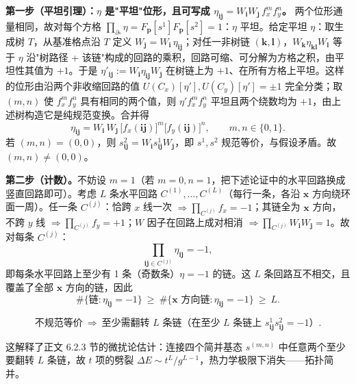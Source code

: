\textbf{第一步（平坦引理）：$\eta$ 是"平坦"位形，且可写成 $\eta_{\pmb{ij}}=W_{\pmb i}W_{\pmb j}\,f_x^{m}f_y^{n}$。}
两个位形通量相同，故对每个方格 $\prod_{\partial\square}\eta=F_{\pmb p}[s^1]F_{\pmb p}[s^2]=1$：$\eta$ 平坦。给定平坦 $\eta$：取生成树 $T$，从基准格点沿 $T$ 定义 $W_{\pmb j}=W_{\pmb i}\,\eta_{\pmb{ij}}$；对任一非树链 $(\pmb k,\pmb l)$，$W_{\pmb k}\eta_{\pmb{kl}}W_{\pmb l}$ 等于 $\eta$ 沿"树路径 + 该链"构成的回路的乘积，回路可缩、可分解为方格之积，由平坦性其值为 $+1$。于是 $\eta'_{\pmb{ij}}:=W_{\pmb i}\eta_{\pmb{ij}}W_{\pmb j}$ 在树链上为 $+1$、在所有方格上平坦。这样的位形由沿两个非收缩回路的值 $U(C_x)[\eta'],U(C_y)[\eta']=\pm1$ 完全分类；取 $(m,n)$ 使 $f_x^{m}f_y^{n}$ 具有相同的两个值，则 $\eta'f_x^{m}f_y^{n}$ 平坦且两个绕数均为 $+1$，由上述树构造它是纯规范变换。合并得
\begin{equation*}
\eta_{\pmb{ij}}=W_{\pmb i}\,W_{\pmb j}\,\bigl[f_x(\pmb{ij})\bigr]^{m}\bigl[f_y(\pmb{ij})\bigr]^{n},
\qquad m,n\in\{0,1\} .
\end{equation*}
若 $(m,n)=(0,0)$，则 $s^2_{\pmb{ij}}=W_{\pmb i}s^1_{\pmb{ij}}W_{\pmb j}$，即 $s^1,s^2$ 规范等价，与假设矛盾。故 $(m,n)\neq(0,0)$。

\textbf{第二步（计数）。}不妨设 $m=1$（若 $m=0,n=1$，把下述论证中的水平回路换成竖直回路即可）。考虑 $L$ 条水平回路 $C^{(1)},\dots,C^{(L)}$（每行一条，各沿 $\pmb x$ 方向绕环面一周）。任一条 $C^{(j)}$：恰跨 $x$ 线一次 $\Rightarrow\prod_{C^{(j)}}f_x=-1$；其链全为 $\pmb x$ 方向，不跨 $y$ 线 $\Rightarrow\prod_{C^{(j)}}f_y=+1$；$W$ 因子在回路上成对相消 $\Rightarrow\prod_{C^{(j)}}W_{\pmb i}W_{\pmb j}=1$。故对每条 $C^{(j)}$：
\begin{equation*}
\prod_{\pmb{ij}\in C^{(j)}}\eta_{\pmb{ij}}=-1 ,
\end{equation*}
即每条水平回路上至少有 1 条（奇数条）$\eta=-1$ 的链。这 $L$ 条回路互不相交，且覆盖了全部 $\pmb x$ 方向的链，因此
\begin{equation*}
\#\{\text{链}:\eta_{\pmb{ij}}=-1\}
\ \geqslant\ \#\{\pmb x\text{ 方向链}:\eta_{\pmb{ij}}=-1\}
\ \geqslant\ L .
\end{equation*}

\begin{equation*}
\boxed{\ \text{不规范等价}\ \Longrightarrow\ \text{至少需翻转 }L\text{ 条链（在至少 }L\text{ 条链上 }s^1_{\pmb{ij}}s^2_{\pmb{ij}}=-1\text{）}.\ }
\end{equation*}

这解释了正文 6.2.3 节的微扰论估计：连接四个简并基态 $s^{(m,n)}$ 中任意两个至少要翻转 $L$ 条链，故 $t$ 项的劈裂 $\Delta E\sim t^{L}/g^{L-1}$，热力学极限下消失——拓扑简并。

